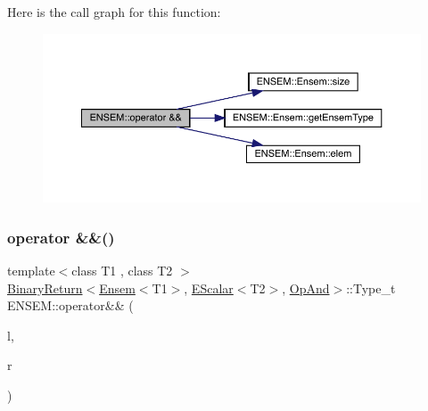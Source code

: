 Here is the call graph for this function\+:\nopagebreak
\begin{figure}[H]
\begin{center}
\leavevmode
\includegraphics[width=350pt]{d1/d9e/group__eensem_ga1a9761f53df3f59110335a2a8cf2d67c_cgraph}
\end{center}
\end{figure}
\mbox{\label{group__eensem_ga00415a6169d18f80656be828f11a157b}} 
\subsubsection{\texorpdfstring{operator \&\&()}{operator \&\&()}\hspace{0.1cm}{\footnotesize\ttfamily [2/3]}}
{\footnotesize\ttfamily template$<$class T1 , class T2 $>$ \\
\mbox{\hyperlink{structENSEM_1_1BinaryReturn}{Binary\+Return}}$<$\mbox{\hyperlink{classENSEM_1_1Ensem}{Ensem}}$<$T1$>$, \mbox{\hyperlink{classENSEM_1_1EScalar}{E\+Scalar}}$<$T2$>$, \mbox{\hyperlink{structENSEM_1_1OpAnd}{Op\+And}}$>$\+::Type\+\_\+t E\+N\+S\+E\+M\+::operator\&\& (\begin{DoxyParamCaption}\item[{const \mbox{\hyperlink{classENSEM_1_1Ensem}{Ensem}}$<$ T1 $>$ \&}]{l,  }\item[{const \mbox{\hyperlink{classENSEM_1_1EScalar}{E\+Scalar}}$<$ T2 $>$ \&}]{r }\end{DoxyParamCaption})\hspace{0.3cm}{\ttfamily [inline]}}

